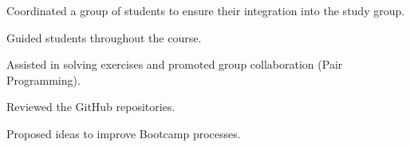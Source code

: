 \begin{cventries}
{\begin{cvitems}
        \item {Coordinated a group of students to ensure their integration into the study group.}
        \item {Guided students throughout the course.}
        \item {Assisted in solving exercises and promoted group collaboration (Pair Programming).}
        \item {Reviewed the GitHub repositories.}
        \item {Proposed ideas to improve Bootcamp processes.}
      \end{cvitems}
    }

\end{cventries}
